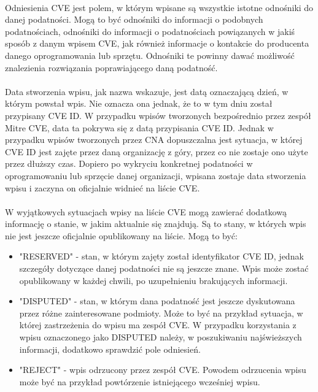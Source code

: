\documentclass[a4paper,12pt,twoside]{article}
\begin{document}
\paragraph{}
Odniesienia CVE jest polem, w którym wpisane są wszystkie istotne odnośniki do danej podatności. Mogą to być odnośniki do informacji o podobnych podatnościach, odnośniki do informacji o podatnościach powiązanych w jakiś sposób z danym wpisem CVE, jak również informacje o kontakcie do producenta danego oprogramowania lub sprzętu. Odnośniki te powinny dawać możliwość znalezienia rozwiązania poprawiającego daną podatność. 
\paragraph{}
Data stworzenia wpisu, jak nazwa wskazuje, jest datą oznaczającą dzień, w którym powstał wpis. Nie oznacza ona jednak, że to w tym dniu został przypisany CVE ID. W przypadku wpisów tworzonych bezpośrednio przez zespół Mitre CVE, data ta pokrywa się z datą przypisania CVE ID. Jednak w przypadku wpisów tworzonych przez CNA dopuszczalna jest sytuacja, w której CVE ID jest zajęte przez daną organizację z góry, przez co nie zostaje ono użyte przez dłuższy czas. Dopiero po wykryciu konkretnej podatności w oprogramowaniu lub sprzęcie danej organizacji, wpisana zostaje data stworzenia wpisu i zaczyna on oficjalnie widnieć na liście CVE.
\paragraph{}
W wyjątkowych sytuacjach wpisy na liście CVE mogą zawierać dodatkową informację o stanie, w jakim aktualnie się znajdują. Są to stany, w których wpis nie jest jeszcze oficjalnie opublikowany na liście. Mogą to być:
\begin{itemize}
\item "RESERVED" - stan, w którym zajęty został identyfikator CVE ID, jednak szczegóły dotyczące danej podatności nie są jeszcze znane. Wpis może zostać opublikowany w każdej chwili, po uzupełnieniu brakujących informacji.
\item "DISPUTED" - stan, w którym dana podatność jest jeszcze dyskutowana przez różne zainteresowane podmioty. Może to być na przykład sytuacja, w której zastrzeżenia do wpisu ma zespół CVE. W przypadku korzystania z wpisu oznaczonego jako DISPUTED należy, w poszukiwaniu najświeższych informacji, dodatkowo sprawdzić pole odniesień.
\item "REJECT" - wpis odrzucony przez zespół CVE. Powodem odrzucenia wpisu może być na przykład powtórzenie istniejącego wcześniej wpisu.
\end{itemize}
\end{document}
